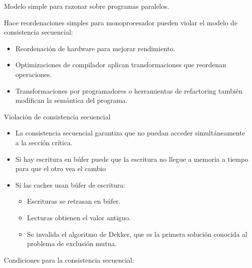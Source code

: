 \documentclass[12pt, twoside, openright]{report} %
\begin{document}
    Modelo simple para razonar sobre programas paralelos.

    Hace reordenaciones simples para monoprocesador pueden violar el
    modelo de consistencia secuencial:

    \begin{itemize}
    
    \item
      Reordenación de hardware para mejorar rendimiento.
    \item
      Optimizaciones de compilador aplican transformaciones que
      reordenan operaciones.
    \item
      Transformaciones por programadores o herramientas de refactoring
      también modifican la semántica del programa.
    \end{itemize}
    \pagebreak

    Violación de consistencia secuencial

    \begin{itemize}
    
    \item
      La consistencia secuencial garantiza que no puedan acceder
      simultáneamente a la sección crítica.
    \item
      Si hay escritura en búfer puede que la escritura no llegue a
      memoria a tiempo para que el otro vea el cambio
    \item
      Si las caches usan búfer de escritura:

      \begin{itemize}
      
      \item
        Escrituras se retrasan en búfer.
      \item
        Lecturas obtienen el valor antiguo.
      \item
        Se invalida el algoritmo de Dekker, que es la primera solución
        conocida al problema de exclusión mutua.
      \end{itemize}
    \end{itemize}

    Condiciones para la consistencia secuencial:
\end{document}
